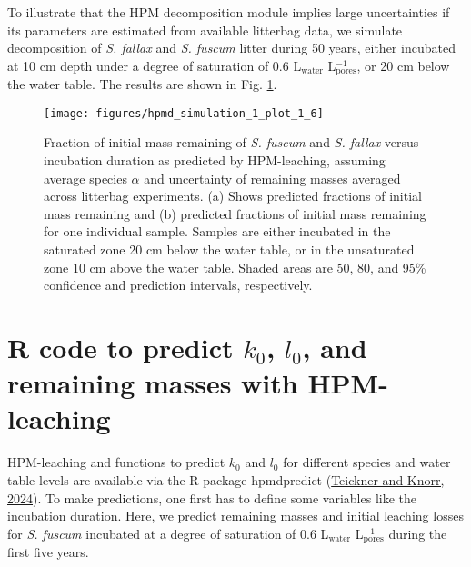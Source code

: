 \documentclass[
  12pt,
]{article}
\begin{document}
To illustrate that the HPM decomposition module implies large uncertainties if its parameters are estimated from available litterbag data, we simulate decomposition of \emph{S. fallax} and \emph{S. fuscum} litter during 50 years, either incubated at 10 cm depth under a degree of saturation of 0.6 L\(_\text{water}\) L\(_\text{pores}^{-1}\), or 20 cm below the water table. The results are shown in Fig. \ref{fig:sup-hpmd-simulation-1-plot-6}.



\begin{figure}[H]

{\centering \texttt{[image: figures/hpmd\_simulation\_1\_plot\_1\_6]} 

}

\caption{Fraction of initial mass remaining of \emph{S. fuscum} and \emph{S. fallax} versus incubation duration as predicted by HPM-leaching, assuming average species \(\alpha\) and uncertainty of remaining masses averaged across litterbag experiments. (a) Shows predicted fractions of initial mass remaining and (b) predicted fractions of initial mass remaining for one individual sample. Samples are either incubated in the saturated zone 20 cm below the water table, or in the unsaturated zone 10 cm above the water table. Shaded areas are 50, 80, and 95\% confidence and prediction intervals, respectively.}\label{fig:sup-hpmd-simulation-1-plot-6}
\end{figure}

\hypertarget{sup-7}{%
\section{\texorpdfstring{R code to predict \(k_0\), \(l_0\), and remaining masses with HPM-leaching}{R code to predict k\_0, l\_0, and remaining masses with HPM-leaching}}\label{sup-7}}

HPM-leaching and functions to predict \(k_0\) and \(l_0\) for different species and water table levels are available via the R package hpmdpredict (\protect\hyperlink{ref-Teickner.2024b}{Teickner and Knorr, 2024}). To make predictions, one first has to define some variables like the incubation duration. Here, we predict remaining masses and initial leaching losses for \emph{S. fuscum} incubated at a degree of saturation of 0.6 L\(_\text{water}\) L\(_\text{pores}^{-1}\) during the first five years.
\end{document}
